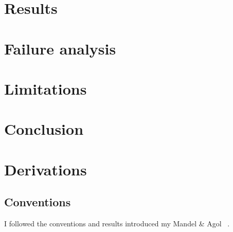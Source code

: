 \documentclass[11pt,a4paper]{article}
\begin{document}
\section{Results}
\label{sec:results}

\section{Failure analysis}
\label{sec:failure-analysis}

\section{Limitations}
\label{sec:limitations}

\section{Conclusion}
\label{sec:conclusion}

\appendix

\section{Derivations}
\label{sec:app-derivations}

\subsection{Conventions}
\label{sec:app-conventions}

I followed the conventions and results introduced my Mandel \& Agol ~\cite{mandel2002}.
\end{document}
